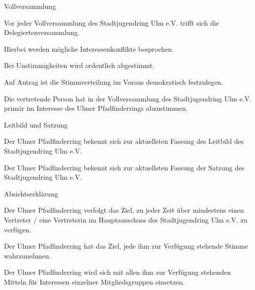 \begin{legal}
        \begin{legal}
            \item Vollversammlung
                \begin{legal}
                    \item Vor jeder Vollversammlung des Stadtjugendring Ulm e.V. trifft sich die 
                          Delegiertenversammlung.
                    \item Hierbei werden mögliche Interessenkonflikte besprochen.
                        \begin{legal}
                            \item Bei Unstimmigkeiten wird ordentlich abgestimmt.
                        \end{legal}
                    \item Auf Antrag ist die Stimmverteilung im Voraus demokratisch festzulegen.
                    \item Die vertretende Person hat in der Vollversammlung des 
                          Stadtjugendring Ulm e.V. primär im Interesse des Ulmer Pfadfinderrings 
                          abzustimmen.
                \end{legal}
            \item Leitbild und Satzung
                \begin{legal}
                    \item Der Ulmer Pfadfinderring bekennt sich zur aktuellsten Fassung 
                          des Leitbild des Stadtjugendring Ulm e.V.
                    \item Der Ulmer Pfadfinderring bekennt sich zur aktuellsten Fassung der 
                          Satzung des Stadtjugendring Ulm e.V.
                \end{legal}
        \end{legal}
    \item Absichtserklärung
        \begin{legal}
            \item Der Ulmer Pfadfinderring verfolgt das Ziel, zu jeder Zeit über mindestens einen 
                  Vertreter / eine Vertreterin im Hauptausschuss des Stadtjugendring Ulm e.V. zu 
                  verfügen.
            \item Der Ulmer Pfadfinderring hat das Ziel, jede ihm zur Verfügung stehende Stimme 
                  wahrzunehmen.
            \item Der Ulmer Pfadfinderring wird sich mit allen ihm zur Verfügung stehenden 
                  Mitteln für Interessen einzelner Mitgliedsgruppen einsetzen.
        \end{legal}
\end{legal}
